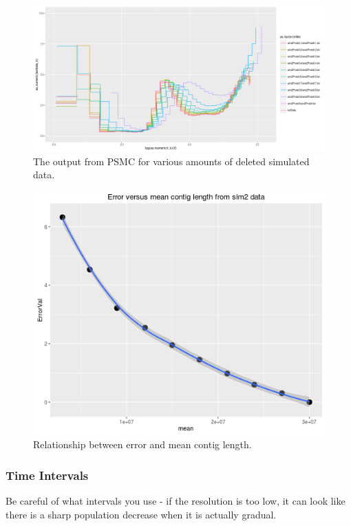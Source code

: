 \documentclass[11pt,a4paper]{article}
\begin{document}
\begin{figure}[h]
  \center
  \includegraphics[width=1\linewidth]{figures/deletedDataPsmcPlots.png}
  \caption{The output from PSMC for various amounts of deleted simulated data.}\label{deletedDataPsmcPlots}
\end{figure}

\begin{figure}[h]
  \center
  \includegraphics[width=.7\linewidth]{figures/sim2ErrorVsMeanContigLength.png}
  \caption{Relationship between error and mean contig length.}\label{sim2ErrorVsMeanContigLength}
\end{figure}

\subsubsection{Time Intervals}
Be careful of what intervals you use - if the resolution is too low, it can look like there is a sharp population decrease when it is actually gradual.
\end{document}
